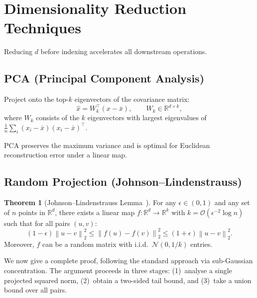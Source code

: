 \documentclass[11pt,a4paper]{article}
\theoremstyle{definition}
\newtheorem{theorem}{Theorem}[section]
\newcommand{\R}{\mathbb{R}}
\newcommand{\calO}{\mathcal{O}}
\newcommand{\norm}[1]{\left\lVert #1 \right\rVert}
\begin{document}
\section{Dimensionality Reduction Techniques}\label{sec:dimred}

Reducing $d$ before indexing accelerates all downstream operations.

\subsection{PCA (Principal Component Analysis)}

Project onto the top-$k$ eigenvectors of the covariance matrix:
\[
  \hat{x} = W_k^\top (x - \bar{x}), \qquad W_k \in \R^{d \times k},
\]
where $W_k$ consists of the $k$ eigenvectors with largest eigenvalues
of $\frac{1}{n}\sum_i (x_i - \bar{x})(x_i - \bar{x})^\top$.

PCA preserves the maximum variance and is optimal for Euclidean
reconstruction error under a linear map.

\subsection{Random Projection (Johnson--Lindenstrauss)}

\begin{theorem}[Johnson--Lindenstrauss Lemma~\cite{johnson1984extensions}]
For any $\epsilon \in (0,1)$ and any set of $n$ points in $\R^d$, there
exists a linear map $f: \R^d \to \R^k$ with
$k = \calO(\epsilon^{-2} \log n)$ such that for all pairs $(u, v)$:
\[
  (1 - \epsilon)\norm{u-v}_2^2 \leq \norm{f(u) - f(v)}_2^2
  \leq (1+\epsilon)\norm{u-v}_2^2.
\]
Moreover, $f$ can be a random matrix with i.i.d.\ $\mathcal{N}(0,1/k)$
entries.
\end{theorem}

We now give a complete proof, following the standard approach via
sub-Gaussian concentration.  The argument proceeds in three stages:
(1)~analyse a single projected squared norm, (2)~obtain a two-sided
tail bound, and (3)~take a union bound over all pairs.
\end{document}
